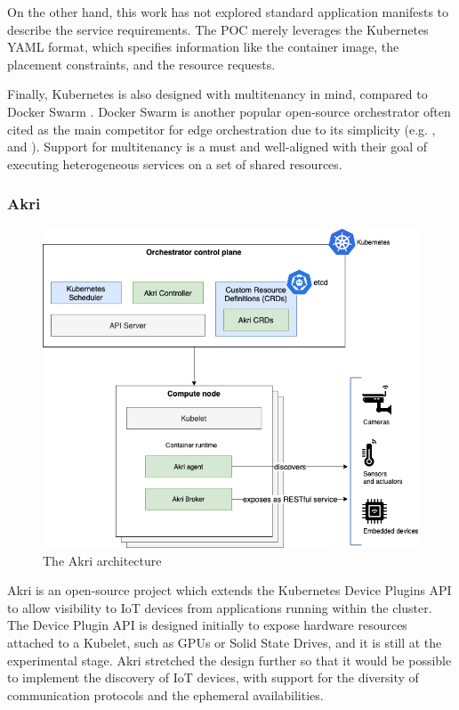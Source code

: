 On the other hand, this work has not explored standard application manifests to describe the service requirements. The POC merely leverages the Kubernetes YAML format, which specifies information like the container image, the placement constraints, and the resource requests.

Finally, Kubernetes is also designed with multitenancy in mind, compared to Docker Swarm \cite{docker-swarm}. Docker Swarm is another popular open-source orchestrator often cited as the main competitor for edge orchestration due to its simplicity (e.g. \cite{bellavista2017feasibility}, and \cite{ismail2015evaluation}). Support for multitenancy is a must and well-aligned with their goal of executing heterogeneous services on a set of shared resources.

\subsubsection{Akri}
\label{sec:akri}

\begin{figure}[ht]
\centering
\includegraphics[width=\columnwidth]{figures/akri}
\caption{The Akri architecture \label{fig:akri}}
\end{figure}

Akri \cite{akri} is an open-source project which extends the Kubernetes Device Plugins API \cite{k8s-device-plugins} to allow visibility to IoT devices from applications running within the cluster. The Device Plugin API is designed initially to expose hardware resources attached to a Kubelet, such as GPUs or Solid State Drives, and it is still at the experimental stage. Akri stretched the design further so that it would be possible to implement the discovery of IoT devices, with support for the diversity of communication protocols and the ephemeral availabilities.

